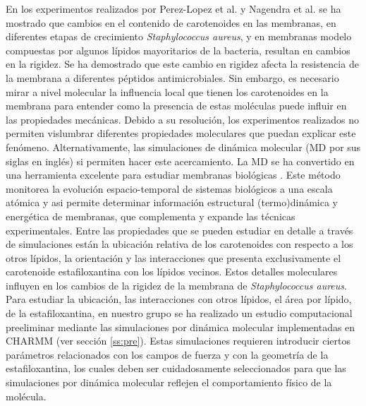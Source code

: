 \documentclass[12pt]{article}
\begin{document}
En los experimentos realizados por Perez-Lopez et al. \cite{Perez-LopezVariationsProperties} y Nagendra et al.  \cite{Nagendra2011} se ha mostrado que cambios en el contenido de carotenoides en las membranas, en diferentes etapas de crecimiento \textit{Staphylococcus aureus}, y en membranas modelo compuestas por algunos lípidos mayoritarios de la bacteria, resultan en cambios en la rigidez. Se ha demostrado que este cambio en rigidez afecta la resistencia de la membrana a diferentes péptidos antimicrobiales. Sin embargo, es necesario mirar a nivel molecular la influencia local que tienen los carotenoides en la membrana para entender como la presencia de estas moléculas puede influir en las propiedades mecánicas. Debido a su resolución, los experimentos realizados no permiten vislumbrar diferentes propiedades moleculares que puedan explicar este fenómeno. Alternativamente, las simulaciones de dinámica molecular (MD por sus siglas en inglés) si permiten hacer este acercamiento. La MD se ha convertido en una herramienta excelente para estudiar membranas biológicas \cite{Marrink2019ComputationalMembranes}. Este método monitorea la evolución espacio-temporal de sistemas biológicos a una escala atómica y asi permite determinar información estructural (termo)dinámica y energética de membranas, que complementa y expande las técnicas experimentales. 
Entre las propiedades que se pueden estudiar en detalle a través de simulaciones están la ubicación relativa de los carotenoides con respecto a los otros lípidos, la orientación y las interacciones que presenta exclusivamente el carotenoide estafiloxantina con los lípidos vecinos. Estos detalles moleculares influyen en los cambios de la rigidez de la membrana de \textit{Staphylococcus aureus}.\\

Para estudiar la ubicación, las interacciones con otros lípidos, el área por lípido,  de la estafiloxantina, en nuestro grupo se ha realizado un estudio computacional preeliminar mediante las simulaciones por dinámica molecular  implementadas en CHARMM \cite{MelendezDelgado2018StudyingBilayers}  (ver sección \ref{ss:pre}). Estas simulaciones requieren introducir ciertos parámetros relacionados con los campos de fuerza y con la geometría de la estafiloxantina, los cuales deben ser cuidadosamente seleccionados para que las simulaciones por dinámica molecular reflejen el comportamiento físico de la molécula.\\
\end{document}
